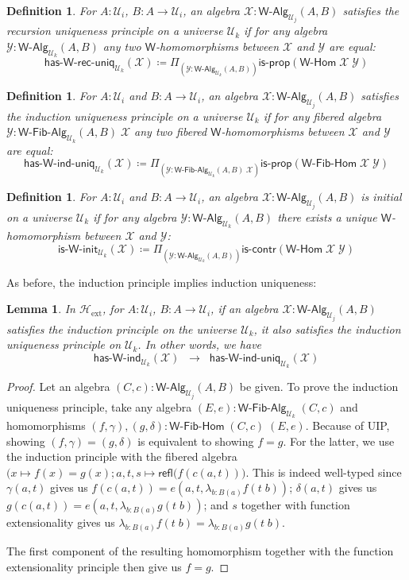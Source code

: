 \documentclass[reqno,10pt,a4paper,oneside]{amsart}
\newcommand{\X}{\mathcal{X}}
\newcommand{\Y}{\mathcal{Y}}
\newcommand{\prd}[1]{\Pi_{#1}}
\newcommand{\lam}[1]{\lambda_{#1}}
\newcommand{\defeq}{\coloneqq}
\newcommand{\refl}{\mathsf{refl}}
\newcommand{\W}{\mathsf{W}}
\newcommand{\UU}{\mathcal{U}}
\newcommand{\WAlg}{\mathsf{W}\text{-}\mathsf{Alg}}
\newcommand{\WFibAlg}{\mathsf{W}\text{-}\mathsf{Fib}\text{-}\mathsf{Alg}}
\newcommand{\WHom}{\mathsf{W}\text{-}\mathsf{Hom}}
\newcommand{\WFibHom}{\mathsf{W}\text{-}\mathsf{Fib}\text{-}\mathsf{Hom}}
\newcommand{\HasWInd}{\mathsf{has}\text{-}\mathsf{W}\text{-}\mathsf{ind}}
\newcommand{\HasWRecUniq}{\mathsf{has}\text{-}\mathsf{W}\text{-}\mathsf{rec}\text{-}\mathsf{uniq}}
\newcommand{\HasWIndUniq}{\mathsf{has}\text{-}\mathsf{W}\text{-}\mathsf{ind}\text{-}\mathsf{uniq}}
\newcommand{\IsWInit}{\mathsf{is}\text{-}\mathsf{\W}\text{-}\mathsf{init}}
\newcommand{\iscontr}{\mathsf{is}\text{-}\mathsf{contr}}
\newcommand{\isprop}{\mathsf{is}\text{-}\mathsf{prop}}
\newcommand{\Hext}{\mathcal{H}_{\mathrm{ext}}}
\numberwithin{equation}{section}
\theoremstyle{mythm}
\newtheorem{lemma}[theorem]{Lemma}
\theoremstyle{mydef}
\newtheorem{definition}[theorem]{Definition}
\theoremstyle{myrmk}
\begin{document}
\begin{definition}\label{def:WRecUniq}
For $A:\UU_i$, $B : A \to \UU_i$, an algebra $\X : \WAlg_{\UU_j}(A,B)$ \emph{satisfies the recursion uniqueness principle} on a universe $\UU_k$ if for any algebra $\Y : \WAlg_{\UU_k}(A,B)$
any two $\W$-homomorphisms between $\X$ and $\Y$ are equal:
\[ \HasWRecUniq_{\UU_k}(\X) \defeq \prd{(\Y:\WAlg_{\UU_k}(A,B))} \isprop(\WHom \; \X \; \Y) \]
\end{definition}

\begin{definition}\label{def:WIndUniq}
For $A:\UU_i$ and $B : A \to \UU_i$, an algebra $\X : \WAlg_{\UU_j}(A,B)$ \emph{satisfies the induction uniqueness principle} on a universe $\UU_k$ if for any fibered algebra $\Y : \WFibAlg_{\UU_k}(A,B) \; \X$ any two fibered $\W$-homomorphisms between $\X$ and $\Y$ are equal:
\[ \HasWIndUniq_{\UU_k}(\X) \defeq \prd{(\Y:\WFibAlg_{\UU_k}(A,B) \; \X)} \isprop(\WFibHom \; \X \; \Y) \]
\end{definition}

\begin{definition}\label{def:WInit}
For $A:\UU_i$ and $B : A \to \UU_i$, an algebra $\X : \WAlg_{\UU_j}(A,B)$ is \emph{initial} on a universe $\UU_k$ if for any algebra $\Y : \WAlg_{\UU_k}(A,B)$ there exists a unique $\W$-homomorphism between $\X$ and $\Y$:
\[ \IsWInit_{\UU_k}(\X) \defeq \prd{(\Y:\WAlg_{\UU_k}(A,B))} \iscontr(\WHom \; \X \; \Y) \]  
\end{definition}

As before, the induction principle implies induction uniqueness:

\begin{lemma}\label{lem:WIndImpUniq}
In $\Hext$, for $A:\UU_i$, $B : A \to \UU_i$, if an algebra $\X : \WAlg_{\UU_j}(A,B)$ satisfies the induction principle on the universe $\UU_k$, it also satisfies the induction uniqueness principle on $\UU_k$. In other words, we have
\[ \HasWInd_{\UU_k}(\X) \;\; \rightarrow \;\; \HasWIndUniq_{\UU_k}(\X) \]
\end{lemma}
\begin{proof}
Let an algebra $(C,c) : \WAlg_{\UU_j}(A,B)$ be given. To prove the induction uniqueness principle, take any algebra $(E,e) : \WFibAlg_{\UU_k} \; (C,c)$ and homomorphisms $(f,\gamma), (g,\delta) : \WFibHom \; (C,c) \; (E,e)$. Because of UIP, showing $(f,\gamma) = (g,\delta)$ is equivalent to showing $f = g$. For the latter, we use the induction principle with the fibered algebra $\big(x \mapsto f(x) = g(x); a,t,s \mapsto \refl(f(c(a,t)) \big)$. This is indeed well-typed since $\gamma(a,t)$ gives us $f(c(a,t)) = e(a,t,\lam{b:B(a)} f(t\;b))$; $\delta(a,t)$ gives us $g(c(a,t)) = e(a,t,\lam{b:B(a)} g(t\;b))$; and $s$ together with function extensionality gives us
$\lam{b:B(a)} f(t\;b) = \lam{b:B(a)} g(t\;b)$.

The first component of the resulting homomorphism together with the function extensionality principle then give us $f = g$.
\end{proof}
\end{document}
